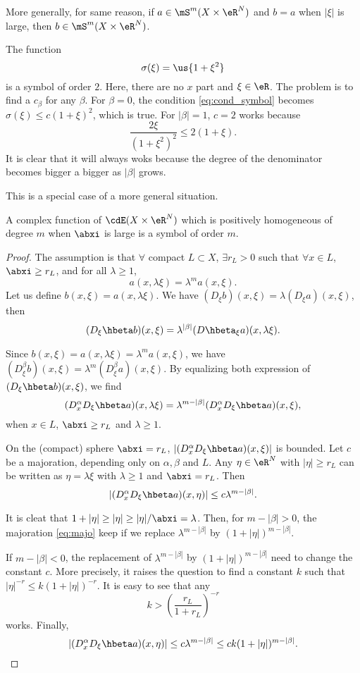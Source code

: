 More generally, for same reason, if $a\in\mS^m(X\times\eR^N)$ and $b=a$ when $|\xi|$ is large, then $b\in\mS^m(X\times\eR^N)$.

The function
\[
   \sigma(\xi)=\us{1+\xi^2}
\]
is a symbol of order $2$. Here, there are no $x$ part and $\xi\in\eR$. The problem is to find a $c_{\beta}$ for any $\beta$. For $\beta=0$, the condition \eqref{eq:cond_symbol} becomes $\sigma(\xi)\leq c(1+\xi)^2$, which is true. For $|\beta|=1$, $c=2$ works because
\[
   \frac{2\xi}{(1+\xi^2)^2}\leq 2(1+\xi).
\]
It is clear that it will always woks because the degree of the denominator becomes bigger a bigger as $|\beta|$ grows.

This is a special case of a more general situation.

\begin{proposition} 
   A complex function of $\cdE(X\times\eR^N)$ which is positively homogeneous of
    degree $m$ when $\abxi$ is large is a symbol of order $m$.
\end{proposition}\label{prop:23.16.4}
\begin{proof}
 The assumption is that $\forall$ compact $L\subset X$, $\exists r_L>0$ such that $\forall x\in L$, $\abxi\geq r_L$, and for all $\lambda\geq 1$,
 \[
   a(x,\lambda\xi)=\lambda^m a(x,\xi).
\]
Let us define $b(x,\xi)=a(x,\lambda\xi)$. We have $(D_{\xi} b)(x,\xi)=\lambda(D_{\xi} a)(x,\xi)$, then
\[
   (D_{\xi}\hbeta b)(x,\xi)=\lambda^{|\beta|}(D\hbeta_{\xi} a)(x,\lambda\xi).
\]

Since $b(x,\xi)=a(x,\lambda\xi)=\lambda^ma(x,\xi)$, we have $(D^{\beta}_{\xi}b)(x,\xi)=\lambda^m(D_{\xi}^{\beta}a)(x,\xi)$. By equalizing both expression of $(D_{\xi}\hbeta b)(x,\xi)$, we find
\[
  (D_x^{\alpha} D_{\xi}\hbeta a)(x,\lambda\xi)=\lambda^{m-|\beta|}(D_x^{\alpha} D_{\xi}\hbeta a)(x,\xi),
\]
when $x\in L$, $\abxi\geq r_L$ and $\lambda\geq 1$.

On the (compact) sphere $\abxi=r_L$, $|(D_x^{\alpha} D_{\xi}\hbeta a)(x,\xi)|$ is bounded. Let $c$ be a majoration, depending only on $\alpha,\beta$ and $L$. Any $\eta\in\eR^N$ with $|\eta|\geq r_L$ can be written as $\eta=\lambda\xi$ with $\lambda\geq 1$ and $\abxi=r_L$. Then
\begin{equation}\label{eq:majo}
   |(D_x^{\alpha} D_{\xi}\hbeta a)(x,\eta)|\leq c\lambda^{m-|\beta|}.
\end{equation}

It is cleat that $1+|\eta|\geq|\eta|\geq|\eta|/\abxi=\lambda$. Then, for $m-|\beta|>0$, the majoration \eqref{eq:majo} keep if we replace $\lambda^{m-|\beta|}$ by  $(1+|\eta|)^{m-|\beta|}$.

If $m-|\beta|<0$, the replacement of $\lambda^{m-|\beta|}$ by  $(1+|\eta|)^{m-|\beta|}$ need to change the constant $c$. More precisely, it raises the question to find a constant $k$ such that $|\eta|^{-r}\leq k(1+|\eta|)^{-r}$. It is easy to see that any
\[
   k>\left(\frac{r_L}{1+r_L}\right)^{-r}
\]
works. Finally,
\begin{equation}
   |(D_x^{\alpha} D_{\xi}\hbeta a)(x,\eta)|\leq c\lambda^{m-|\beta|}
                                      \leq ck(1+|\eta|)^{m-|\beta|}.
\end{equation}
\end{proof}

